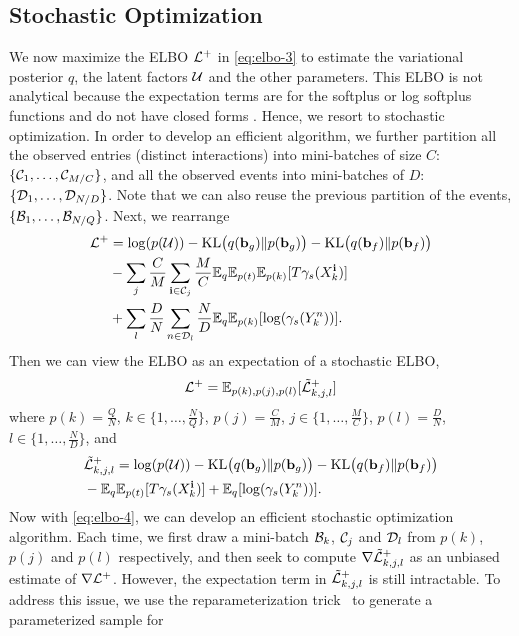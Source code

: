 \subsection{Stochastic Optimization}
\vspace{-0.1in}
We now maximize the ELBO $\mathcal{L}^+$ in \eqref{eq:elbo-3} to estimate the variational posterior $q$, the latent factors ${\mathcal{U}}$ and the other parameters. This ELBO is not analytical because the expectation terms are for the softplus or log softplus functions and do not have closed forms . Hence, we resort to stochastic optimization. In order to develop an efficient algorithm, we further partition all the observed entries (\ie distinct interactions) into mini-batches of size $C$: $\{\mathcal{C}_1, \ldots, \mathcal{C}_{M/C}\} $, and all the observed events into mini-batches of $D$: $\{\mathcal{D}_1, \ldots, \mathcal{D}_{N/D}\}$. Note that we can also reuse the previous partition of the events,  $\{\mathcal{B}_1, \ldots, \mathcal{B}_{N/Q}\}$. Next, we rearrange  
\begin{align}
\mathcal{L}^+ &=  \log(p({\mathcal{U}})) -{\mathrm{KL} }\big(q({\bf b}_g) \| p({\bf b}_g)\big) - {\mathrm{KL} }\big(q({\bf b}_f)\| p({\bf b}_f)\big) \notag \\
& - \sum_{j} \frac{C}{M} \sum_{{\bf i} \in \mathcal{C}_j} \frac{M}{C} \mathbb{E}_q\mathbb{E}_{p(t)}\mathbb{E}_{p(k)}[T\gamma_s(X_k^{\bf i})] \notag \\
& + \sum_{l} \frac{D}{N} \sum_{n \in \mathcal{D}_l} \frac{N}{D} \mathbb{E}_q\mathbb{E}_{p(k)}[\log(\gamma_s(Y_k^n))].
\end{align}
Then we can view the ELBO as an expectation of a stochastic ELBO, 
\begin{align}
\mathcal{L}^+ = \mathbb{E}_{p(k), p(j), p(l)} [\tilde{\mathcal{L}}^+_{k,j,l}] \label{eq:elbo-4}
\end{align}
where $p(k) = \frac{Q}{N}$, $k \in \{1, \ldots, \frac{N}{Q}\}$, $p(j) = \frac{C}{M}$, $j \in \{1, \ldots, \frac{M}{C}\}$,  $p(l) = \frac{D}{N}$, $l \in \{1, \ldots, \frac{N}{D}\}$, and 
\begin{align}
&\tilde{\mathcal{L}}^+_{k,j,l} = \log(p({\mathcal{U}})) -{\mathrm{KL} }\big(q({\bf b}_g) \| p({\bf b}_g)\big) - {\mathrm{KL} }\big(q({\bf b}_f)\| p({\bf b}_f)\big) \notag \\
& -\mathbb{E}_q\mathbb{E}_{p(t)}[T\gamma_s(X_k^{\bf i})]  +  \mathbb{E}_q[\log(\gamma_s(Y_k^n))]. \notag 
\end{align}
Now with \eqref{eq:elbo-4}, we can develop an efficient stochastic optimization algorithm. Each time, we first draw a mini-batch $\mathcal{B}_k$, $\mathcal{C}_j$ and $\mathcal{D}_l$ from $p(k)$, $p(j)$ and $p(l)$ respectively, and then seek to compute  $\nabla \tilde{\mathcal{L}}^+_{k,j,l}$ as an unbiased estimate of $\nabla \mathcal{L}^+$. However, the expectation term in $ \tilde{\mathcal{L}}^+_{k,j,l}$ is still intractable. To address this issue, we use the reparameterization trick~\citep{kingma2013auto} to generate a parameterized sample for
